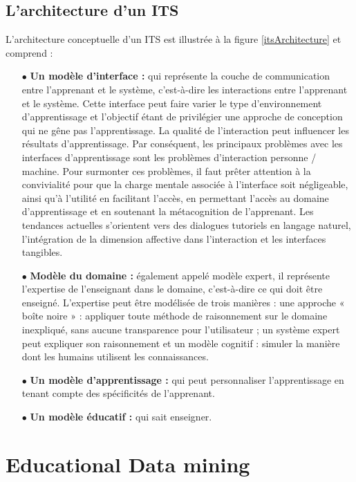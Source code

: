 \subsection{L’architecture d’un ITS}
L'architecture conceptuelle d'un ITS est illustrée à la figure \ref{itsArchitecture} et comprend : \cite{handbook_of_educational_data_mining}
\begin{itemize}
	\item[$\bullet$] \textbf{Un modèle d'interface :} qui représente la couche de communication entre l'apprenant et le système, c'est-à-dire les interactions entre l'apprenant et le système. Cette interface peut faire varier le type d'environnement d'apprentissage et l'objectif étant de privilégier une approche de conception qui ne gêne pas l'apprentissage. La qualité de l'interaction peut influencer les résultats d'apprentissage. Par conséquent, les principaux problèmes avec les interfaces d'apprentissage sont les problèmes d'interaction personne / machine. Pour surmonter ces problèmes, il faut prêter attention à la convivialité pour que la charge mentale associée à l’interface soit négligeable, ainsi qu’à l’utilité en facilitant l’accès, en permettant l’accès au domaine d’apprentissage et en soutenant la métacognition de l’apprenant. Les tendances actuelles s'orientent vers des dialogues tutoriels en langage naturel, l'intégration de la dimension affective dans l'interaction et les interfaces tangibles.	
	\item[$\bullet$] \textbf{Modèle du domaine :} également appelé modèle expert, il représente l'expertise de l'enseignant dans le domaine, c'est-à-dire ce qui doit être enseigné. L’expertise peut être modélisée de trois manières : une approche « boîte noire » : appliquer toute méthode de raisonnement sur le domaine inexpliqué, sans aucune transparence pour l'utilisateur ; un système expert peut expliquer son raisonnement et un modèle cognitif : simuler la manière dont les humains utilisent les connaissances.
  \item[$\bullet$] \textbf{Un modèle d'apprentissage :} qui peut personnaliser l'apprentissage en tenant compte des spécificités de l'apprenant.
  \item[$\bullet$] \textbf{Un modèle éducatif :} qui sait enseigner.
\end{itemize}
    
\section{Educational Data mining}
